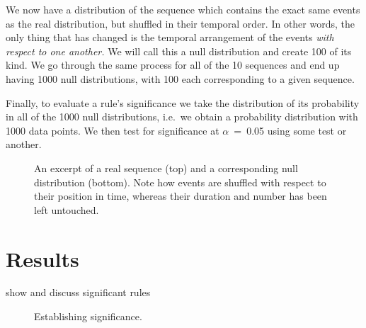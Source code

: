 We now have a distribution of the sequence which contains the exact same events as the real distribution, but shuffled in their temporal order. In other words, the only thing that has changed is the temporal arrangement of the events \emph{with respect to one another.} We will call this a null distribution and create 100 of its kind. %
We go through the same process for all of the 10 sequences and end up having 1000 null distributions, with 100 each corresponding to a given sequence.

Finally, to evaluate a rule's significance we take the distribution of its probability in all of the 1000 null distributions, i.e.~we obtain a probability distribution with 1000 data points. We then test for significance at \(\alpha\)~=~0.05 using some test or another. %

\begin{figure}
	\centering
	
	\caption{An excerpt of a real sequence (top) and a corresponding null distribution (bottom). Note how events are shuffled with respect to their position in time, whereas their duration and number has been left untouched.}
	\label{fig:null}
\end{figure}
%
%

\section{Results}
\label{sec:significanceresults}
show and discuss significant rules
\begin{figure}[h]
	\centering
	
	\caption{Establishing significance.}
	\label{fig:null}
\end{figure}